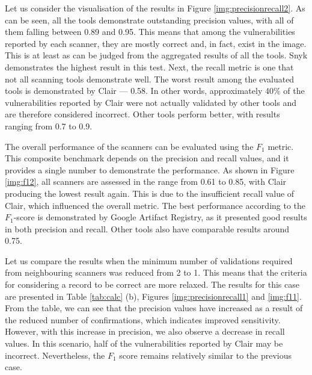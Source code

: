 Let us consider the visualisation of the results in Figure \ref{img:precisionrecall2}. As can be seen, all the tools demonstrate outstanding precision values, with all of them falling between 0.89 and 0.95. This means that among the vulnerabilities reported by each scanner, they are mostly correct and, in fact, exist in the image. This is at least as can be judged from the aggregated results of all the tools. Snyk demonstrates the highest result in this test. Next, the recall metric is one that not all scanning tools demonstrate well. The worst result among the evaluated tools is demonstrated by Clair — 0.58. In other words, approximately 40\% of the vulnerabilities reported by Clair were not actually validated by other tools and are therefore considered incorrect. Other tools perform better, with results ranging from 0.7 to 0.9.


The overall performance of the scanners can be evaluated using the $F_1$ metric. This composite benchmark depends on the precision and recall values, and it provides a single number to demonstrate the performance. As shown in Figure \ref{img:f12}, all scanners are assessed in the range from 0.61 to 0.85, with Clair producing the lowest result again. This is due to the insufficient recall value of Clair, which influenced the overall metric. The best performance according to the $F_1$-score is demonstrated by Google Artifact Registry, as it presented good results in both precision and recall. Other tools also have comparable results around 0.75.


Let us compare the results when the minimum number of validations required from neighbouring scanners was reduced from 2 to 1. This means that the criteria for considering a record to be correct are more relaxed. The results for this case are presented in Table \ref{tab:calc} (b), Figures \ref{img:precisionrecall1} and \ref{img:f11}. From the table, we can see that the precision values have increased as a result of the reduced number of confirmations, which indicates improved sensitivity. However, with this increase in precision, we also observe a decrease in recall values. In this scenario, half of the vulnerabilities reported by Clair may be incorrect. Nevertheless, the $F_1$ score remains relatively similar to the previous case.



